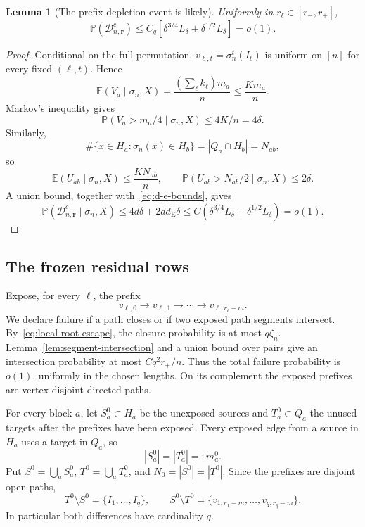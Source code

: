 \documentclass[11pt]{article}
\newcommand{\E}{\mathbb E}
\newcommand{\Pp}{\mathbb P}
\newcommand{\1}{\mathbf 1}
\newcommand{\cD}{\mathcal D}
\newtheorem{lemma}[theorem]{Lemma}
\theoremstyle{definition}
\theoremstyle{remark}
\begin{document}
\begin{lemma}[The prefix-depletion event is likely]
\label{lem:depletion-stopping}
Uniformly in $r_\ell\in[r_-,r_+]$,
\begin{equation}\label{eq:D-probability}
 \Pp(\cD_{n,\mathbf r}^c)
 \le C_q\left[
 \delta^{3/4}L_\delta
 +\delta^{1/2}L_\delta
 \right]=o(1).
\end{equation}
\end{lemma}

\begin{proof}
Conditional on the full permutation, $v_{\ell,t}=\sigma_n^t(I_\ell)$ is
uniform on $[n]$ for every fixed $(\ell,t)$.  Hence
\[
  \E(V_a\mid\sigma_n,X)=\frac{(\sum_\ell k_\ell)m_a}{n}
  \leq\frac{Km_a}{n}.
\]
Markov's inequality gives
\[
  \Pp(V_a>m_a/4\mid\sigma_n,X)\leq4K/n=4\delta.
\]
Similarly,
\[
 \#\{x\in H_a:\sigma_n(x)\in H_b\}
 =|Q_a\cap H_b|=N_{ab},
\]
so
\[
 \E(U_{ab}\mid\sigma_n,X)\leq\frac{KN_{ab}}n,
 \qquad
 \Pp(U_{ab}>N_{ab}/2\mid\sigma_n,X)\leq2\delta.
\]
A union bound, together with~\eqref{eq:d-e-bounds}, gives
\[
 \Pp(\cD_{n,\mathbf r}^c\mid\sigma_n,X)
 \leq4d\delta+2d d_{\mathrm E}\delta
 \leq C\left(
   \delta^{3/4}L_\delta
   +\delta^{1/2}L_\delta
 \right)=o(1).
\]
\end{proof}

\subsection{The frozen residual rows}

Expose, for every $\ell$, the prefix
\[
 v_{\ell,0}\to v_{\ell,1}\to\cdots\to v_{\ell,r_\ell-m}.
\]
We declare failure if a path closes or if two exposed path segments
intersect.  By~\eqref{eq:local-root-escape}, the closure probability is
at most $q\zeta_n$.  Lemma~\ref{lem:segment-intersection} and a union
bound over pairs give an intersection probability at most
$Cq^2r_+/n$.  Thus the total failure probability is $o(1)$, uniformly in
the chosen lengths.  On its complement the exposed prefixes are
vertex-disjoint directed paths.

For every block $a$, let $S_a^0\subset H_a$ be the unexposed sources and
$T_a^0\subset Q_a$ the unused targets after the prefixes have been
exposed.  Every exposed edge from a source in $H_a$ uses a target in
$Q_a$, so
\begin{equation}\label{eq:residual-square}
  |S_a^0|=|T_a^0|=:m_a^0.
\end{equation}
Put $S^0=\bigcup_aS_a^0$, $T^0=\bigcup_aT_a^0$, and
$N_0=|S^0|=|T^0|$.  Since the prefixes are disjoint open paths,
\begin{equation}\label{eq:symmetric-difference}
 T^0\setminus S^0=\{I_1,\dots,I_q\},
 \qquad
 S^0\setminus T^0
 =\{v_{1,r_1-m},\dots,v_{q,r_q-m}\}.
\end{equation}
In particular both differences have cardinality $q$.
\end{document}
